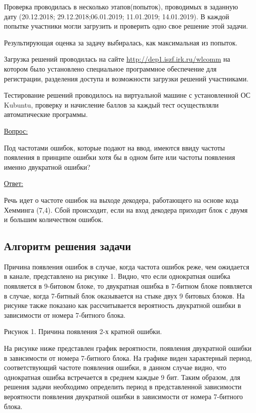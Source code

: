 Проверка проводилась в несколько этапов(попыток), проводимых в заданную дату (20.12.2018; 29.12.2018;06.01.2019; 11.01.2019; 14.01.2019). В каждой попытке участники могли загрузить и проверить одно свое решение этой задачи.

Результирующая оценка за задачу выбиралась, как максимальная из попыток.

Загрузка решений проводилась на сайте \url{http://dep1.iszf.irk.ru/wlcomm} на котором было установлено специальное программное обеспечение для регистрации, разделения доступа и возможности загрузки решений участниками.

Тестирование решений проводилось на виртуальной машине с установленной ОС Kubuntu, проверку и начисление баллов за каждый тест осуществляли автоматические программы.

\commentsSection

\underline{Вопрос:} 

Под частотами ошибок, которые подают на ввод, имеются ввиду частоты появления в принципе ошибки хотя бы в одном бите или частоты появления именно двукратной ошибки?

\underline{Ответ:}

Речь идет о частоте ошибок на выходе декодера, работающего на основе кода Хемминга (7,4). Сбой происходит, если на вход декодера приходит блок с двумя и большим количеством ошибок.

\subsection*{Алгоритм решения задачи}

Причина появления ошибок в случае, когда частота ошибок реже, чем ожидается в канале, представлено на рисунке 1. Видно, что если однократная ошибка появляется в 9-битовом блоке, то двукратная ошибка в 7-битном блоке появляется в случае, когда 7-битный блок оказывается на стыке двух 9 битовых блоков. На рисунке также показано как рассчитывается вероятность двукратной ошибки в зависимости от номера 7-битного блока. 


\begin{center}
    Рисунок 1. Причина появления 2-х кратной ошибки.
\end{center}

На рисунке ниже представлен график вероятности, появления двукратной ошибки в зависимости от номера 7-битного блока. На графике виден характерный период, соответствующий частоте появления ошибки, в данном случае видно, что однократная ошибка встречается в среднем каждые 9 бит. Таким образом, для решения задачи необходимо определить период в представленной зависимости вероятности появления двукратной ошибки в зависимости от номера 7-битного блока.

